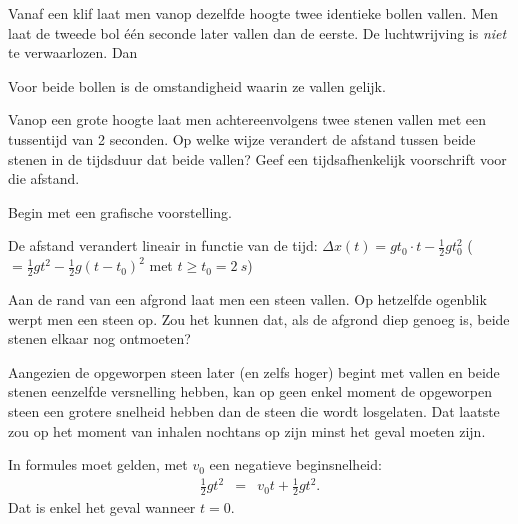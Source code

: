 \documentclass{ximera}
\begin{document}
\begin{exercise}
	Vanaf een klif laat men vanop dezelfde hoogte twee identieke bollen vallen. Men laat de tweede bol \'e\'en seconde later vallen dan de eerste. De luchtwrijving is \textit{niet} te verwaarlozen. Dan
	\begin{multipleChoice}
	\end{multipleChoice}
	\begin{oplossing}
		Voor beide bollen is de omstandigheid waarin ze vallen gelijk.
	\end{oplossing}
\end{exercise}

\begin{exercise}
	Vanop een grote hoogte laat men achtereenvolgens twee stenen vallen met een tussentijd van 2 seconden. 
	Op welke wijze verandert de afstand tussen beide stenen in de tijdsduur dat beide vallen?
	Geef een tijdsafhenkelijk voorschrift voor die afstand. 
	\begin{hint}
		Begin met een grafische voorstelling.
	\end{hint}
	\begin{oplossing}
		De afstand verandert lineair in functie van de tijd: $\Delta x(t)=gt_0\cdot t-\frac{1}{2}gt_0^2$ ($=\frac{1}{2}gt^2-\frac{1}{2}g(t-t_0)^2$ met $t\geq t_0=\SI{2}{s}$)
	\end{oplossing}
\end{exercise}

\begin{exercise}
	Aan de rand van een afgrond laat men een steen vallen. Op hetzelfde ogenblik werpt men een steen op. Zou het kunnen dat, als de afgrond diep genoeg is, beide stenen elkaar nog ontmoeten?

	\begin{oplossing}
		Aangezien de opgeworpen steen later (en zelfs hoger) begint met vallen en beide stenen eenzelfde versnelling hebben, kan op geen enkel moment de opgeworpen steen een grotere snelheid hebben dan de steen die wordt losgelaten. Dat laatste zou op het moment van inhalen nochtans op zijn minst het geval moeten zijn.

		In formules moet gelden, met $v_0$ een negatieve beginsnelheid:
		\begin{eqnarray*}
			\frac{1}{2}gt^2&=&v_0t+\frac{1}{2}gt^2.
		\end{eqnarray*}
		Dat is enkel het geval wanneer $t=0$.
	\end{oplossing}
\end{exercise}
\end{document}
